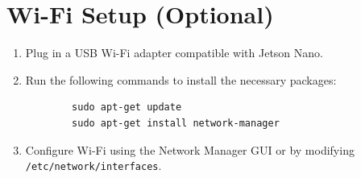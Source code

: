 \section{Wi-Fi Setup (Optional)}
\begin{enumerate}
	\item Plug in a USB Wi-Fi adapter compatible with Jetson Nano.
	\item Run the following commands to install the necessary packages:
	\begin{verbatim}
		sudo apt-get update
		sudo apt-get install network-manager
	\end{verbatim}
	\item Configure Wi-Fi using the Network Manager GUI or by modifying \texttt{/etc/network/interfaces}.
\end{enumerate}